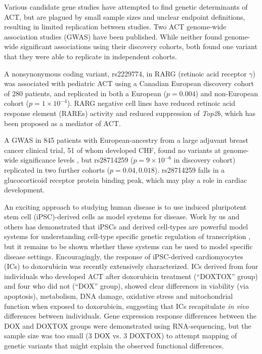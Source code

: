 \documentclass{article}
\begin{document}
{Various candidate gene studies have attempted to find genetic determinants of ACT, but are plagued by small sample sizes and unclear endpoint definitions, resulting in limited replication between studies. 
Two ACT genome-wide association studies (GWAS) have been published. 
While neither found genome-wide significant associations using their discovery cohorts, both found one variant that they were able to replicate in independent cohorts. 

A nonsynonymous coding variant, rs2229774, in RARG (retinoic acid receptor $\gamma$) was associated with pediatric ACT using a Canadian European discovery cohort of 280 patients\cite{Aminkeng2015}, and replicated in both a European ($p=0.004$) and non-European cohort ($p=1 \times 10^{-4}$). 
RARG negative cell lines have reduced retinoic acid response element (RAREs) activity and reduced suppression of \emph{Top2b}\cite{Aminkeng2015}, which has been proposed as a mediator of ACT. 

A GWAS in 845 patients with European-ancestry from a large adjuvant breast cancer clinical trial, 51 of whom developed CHF, found no variants at genome-wide significance levels\cite{Schneider2016} , but rs28714259 ($p=9 \times 10^{-6}$ in discovery cohort) replicated in two further cohorts ($p=0.04, 0.018$). 
rs28714259 falls in a glucocorticoid receptor protein binding peak, which may play a role in cardiac development. 

An exciting approach to studying human disease is to use induced pluripotent stem cell (iPSC)-derived cells as model systems for disease. Work by us and others has demonstrated that iPSCs and derived cell-types are powerful model systems for understanding cell-type specific genetic regulation of transcription \citep{Thomas2015,Burrows2016,Banovich2017,hipsci}, but it remains to be shown whether these systems can be used to model specific disease settings. Encouragingly, the response of iPSC-derived cardiomyocytes (ICs) to doxorubicin was recently extensively characterized\cite{Burridge2016}. ICs derived from four individuals who developed ACT after doxorubicin treatment (``DOXTOX'' group) and four who did not (``DOX'' group), showed clear differences in viability (via apoptosis), metabolism, DNA damage, oxidative stress and mitochondrial function when exposed to doxorubicin, suggesting that ICs recapitulate \emph{in vivo} differences between individuals. Gene expression response differences between the DOX and DOXTOX groups were demonstrated using RNA-sequencing, but the sample size was too small (3 DOX vs. 3 DOXTOX) to attempt mapping of genetic variants that might explain the observed functional differences. 

}
\end{document}
